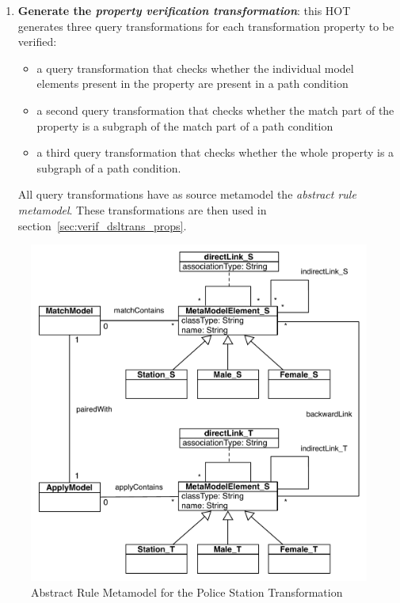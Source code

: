 \begin{enumerate}
  \item \textbf{Generate the \emph{property verification transformation}}: this
  HOT generates three query transformations for each transformation property to
  be verified:
  \begin{itemize}
    \item a query transformation that checks whether the individual model
    elements present in the property are present in a path condition
    \item a second query transformation that checks whether the match part of the
    property is a subgraph of the match part of a path condition
    \item a third query transformation that checks whether the whole property is a subgraph of
    a path condition.
  \end{itemize}
  
  All query transformations have as source metamodel the \emph{abstract rule
  metamodel}. These transformations are then used in
  section~\ref{sec:verif_dsltrans_props}.
\end{enumerate}

\begin{figure}[h!] \centering \includegraphics[scale=.6]{./figures/abstract_rule_metamodel.pdf}
	\caption{Abstract Rule Metamodel for the Police Station Transformation}
	\label{fig:abstract_rule_metamodel_station_trafo}
\end{figure}




